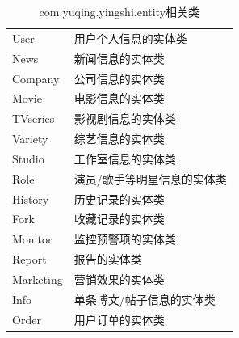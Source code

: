 \begin{table}
	\caption{com.yuqing.yingshi.entity相关类}
	\centering
	\begin{tabular}{|p{3cm}|p{10cm}|} 
		\hline 
		\rowcolor[HTML]{DAE8FC} 
		\multicolumn{2}{|c|}{com.yuqing.yingshi.entity相关类} \\ 
		\hline 
		User &用户个人信息的实体类\\
		News &新闻信息的实体类\\
		Company &公司信息的实体类\\
		Movie&电影信息的实体类\\
		TVseries&影视剧信息的实体类\\
		Variety&综艺信息的实体类\\
		Studio&工作室信息的实体类\\
		Role&演员/歌手等明星信息的实体类\\
		History&历史记录的实体类\\
		Fork&收藏记录的实体类\\
		Monitor&监控预警项的实体类\\
		Report&报告的实体类\\
		Marketing&营销效果的实体类\\
		Info &单条博文/帖子信息的实体类\\
		Order &用户订单的实体类\\
		\hline 
	\end{tabular}
\end{table}




